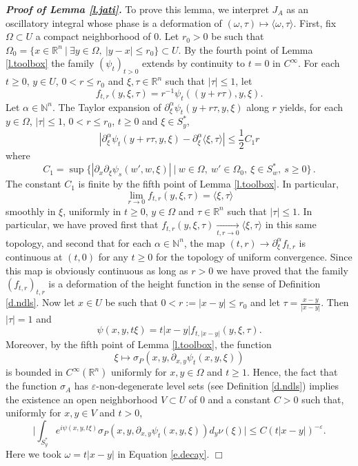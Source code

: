 \documentclass[10pt,twoside]{article}
\newcommand{\eps}{\varepsilon}
\newcommand{\R}{\mathbb{R}}
\newcommand{\N}{\mathbb{N}}
\newenvironment{prf}[1][]
{\vskip 2mm  {\it \bf Proof#1. }}{$\Box$ \vskip 2mm}
\numberwithin{theorem}{section}
\begin{document}
\begin{prf}[ of Lemma \ref{l.jati}]
  To prove this lemma, we interpret $J_A$ as an oscillatory integral whose phase is a deformation of $(\omega,\tau)\mapsto\langle\omega,\tau\rangle$. First, fix $\Omega\subset U$ a compact neighborhood of $0$. Let $r_0>0$ be such that $\Omega_0=\{x\in\R^n\ |\ \exists y\in \Omega,\ |y-x|\leq r_0\}\subset U$. By the fourth point of Lemma \ref{l.toolbox} the family $(\psi_t)_{t>0}$ extends by continuity to $t=0$ in $C^\infty$. For each $t\geq 0$, $y\in U$, $0<r\leq r_0$ and $\xi,\tau\in\R^n$ such that $|\tau|\leq 1$, let
\[
f_{t,r}(y,\xi,\tau)=r^{-1}\psi_t((y+r\tau),y,\xi).
\]
Let $\alpha\in\N^n$. The Taylor expansion of $\partial^\alpha_\xi\psi_t(y+r\tau,y,\xi)$ along $r$ yields, for each $y\in \Omega$, $|\tau|\leq 1$, $0<r\leq r_0$, $t\geq 0$ and $\xi\in S^*_y$,
\[
\left|\partial^\alpha_\xi\psi_t(y+r\tau,y,\xi)-\partial^\alpha_\xi\langle \xi,\tau\rangle\right|\leq \frac{1}{2}C_1r
\]
where
\[
C_1=\sup\{|\partial_x\partial_\xi\psi_s(w',w,\xi)|\ |\ w\in \Omega,\ w'\in \Omega_0,\ \xi\in S^*_w,\ s\geq 0\}\, .
\]
The constant $C_1$ is finite by the fifth point of Lemma \ref{l.toolbox}. In particular,
\[
\lim_{r\rightarrow 0}f_{t,r}(y,\xi,\tau)=\langle\xi,\tau\rangle
\]
smoothly in $\xi$, uniformly in $t\geq 0$, $y\in\Omega$ and $\tau\in\R^n$ such that $|\tau|\leq 1$. In particular, we have proved first that $f_{t,r}(y,\xi,\tau)\xrightarrow[t,r\rightarrow 0]{} \langle \xi,\tau\rangle$ in this same topology, and second that for each $\alpha\in\N^n$, the map $(t,r)\rightarrow \partial^\alpha_\xi f_{t,r}$ is continuous at $(t,0)$ for any $t\geq 0$ for the topology of uniform convergence. Since this map is obviously continuous as long as $r>0$ we have proved that the family $(f_{t,r})_{t,r}$ is a deformation of the height function in the sense of Definition \ref{d.ndls}. Now let $x\in U$ be such that  $0<r:=|x-y|\leq r_0$ and let $\tau =\frac{x-y}{|x-y|}$. Then $|\tau|=1$ and
\[\psi(x,y,t\xi)=t|x-y|f_{t,|x-y|}(y,\xi,\tau).\]
Moreover, by the fifth point of Lemma \ref{l.toolbox}, the function
\[
\xi\mapsto\sigma_P(x,y,\partial_{x,y}\psi_t(x,y,\xi))
\]
is bounded in $C^\infty(\R^n)$ uniformly for $x,y\in \Omega$ and $t\geq 1$. Hence, the fact that the function $\sigma_A$ has $\eps$-non-degenerate level sets (see Definition \ref{d.ndls}) implies the existence an open neighborhood $V\subset U$ of $0$ and a constant $C>0$ such that, uniformly for $x,y\in V$ and $t>0$,
\[\Big|\int_{S^*_y}e^{i\psi(x,y,t\xi)}\sigma_P(x,y,\partial_{x,y}\psi_t(x,y,\xi))d_y\nu(\xi)\Big|\leq C(t|x-y|)^{-\eps}.\]
Here we took $\omega = t|x-y|$ in Equation \eqref{e.decay}.
\end{prf}
\end{document}
